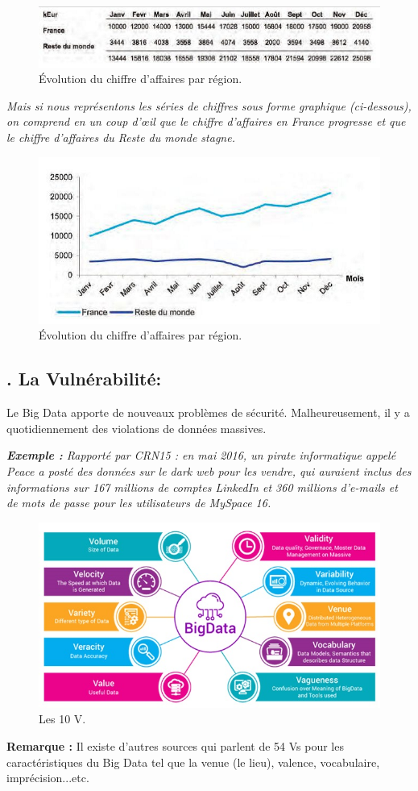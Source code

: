 \begin{figure}[h]
	\centering
	\includegraphics[scale=0.8]{img/fig5}
	\caption{Évolution du chiffre d'affaires par région.}
\end{figure}

\textit{Mais si nous représentons les séries de chiffres sous forme graphique (ci-dessous), on comprend en un coup d'œil que le chiffre d'affaires en France progresse et que le chiffre d'affaires du Reste du monde stagne.}

\begin{figure}[h]
	\centering
	\includegraphics[scale=0.8]{img/fig6}
	\caption{Évolution du chiffre d'affaires par région.}
\end{figure}

\subsection*{. La Vulnérabilité:}
Le Big Data apporte de nouveaux problèmes de sécurité. Malheureusement, il y a quotidiennement des violations de données massives.

\textit{\textbf{Exemple :} Rapporté par CRN15 : en mai 2016, un pirate informatique appelé Peace a posté des données sur le dark web pour les vendre, qui auraient inclus des informations sur 167 millions de comptes LinkedIn et 360 millions d'e-mails et de mots de passe pour les utilisateurs de MySpace 16.}

\begin{figure}[h]
	\centering
	\includegraphics[scale=0.5]{img/fig4}
	\caption{Les 10 V.}
\end{figure}

\textbf{Remarque :} Il existe d'autres sources qui parlent de 54 Vs pour les caractéristiques du Big Data tel que la venue (le lieu), valence, vocabulaire, imprécision...etc.






